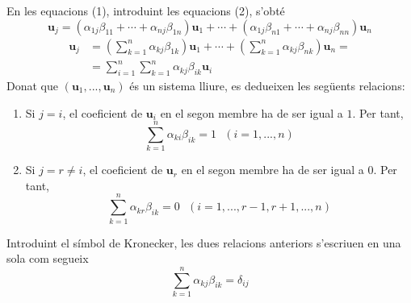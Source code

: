 \begin{prova}
En les equacions (1), introduint les equacions (2), s'obté 
\begin{equation*}
\mathbf{u}_{j}=(\alpha _{1j}\beta _{11}+\cdots +\alpha _{nj}\beta _{1n})%
\mathbf{u}_{1}+\cdots +(\alpha _{1j}\beta _{n1}+\cdots +\alpha _{nj}\beta
_{nn})\mathbf{u}_{n}
\end{equation*}%
\begin{align*}
\mathbf{u}_{j} &=\left( \sum_{k=1}^{n}\alpha _{kj}\beta _{1k}\right) 
\mathbf{u}_{1}+\cdots +\left( \sum_{k=1}^{n}\alpha _{kj}\beta _{nk}\right) 
\mathbf{u}_{n}= \\
&=\sum_{i=1}^{n}\sum_{k=1}^{n}\alpha _{kj}\beta _{ik}\mathbf{u}_{i}
\end{align*}%
Donat que $(\mathbf{u}_{1},...,\mathbf{u}_{n})$ és un sistema lliure, es
dedueixen les següents relacions:

\begin{enumerate}
\item Si $j=i$, el coeficient de $\mathbf{u}_{i}$ en el segon membre
ha de ser igual a $1$. Per tant, 
\begin{equation*}
\sum_{k=1}^{n}\alpha _{ki}\beta _{ik}=1\text{ \ \ \ }(i=1,...,n)
\end{equation*}

\item Si $j=r\neq i$, el coeficient de $\mathbf{u}_{r}$ en el segon
membre ha de ser igual a $0$. Per tant, 
\begin{equation*}
\sum_{k=1}^{n}\alpha _{kr}\beta _{ik}=0\text{ \ \ }(i=1,...,r-1,r+1,...,n)
\end{equation*}
\end{enumerate}

Introduint el símbol de Kronecker, les dues relacions anteriors s'escriuen en una sola com segueix 
\begin{equation*}
\sum_{k=1}^{n}\alpha _{kj}\beta _{ik}=\delta _{ij}
\end{equation*}
\end{prova}

